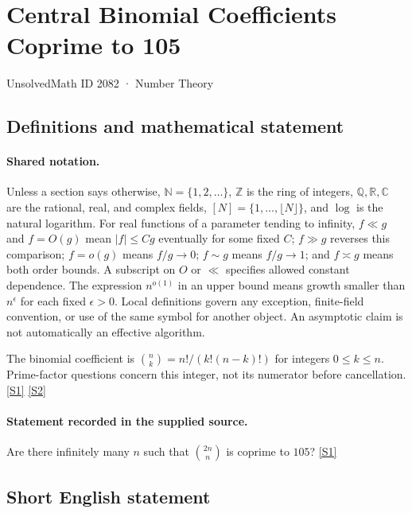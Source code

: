 \documentclass[11pt,a4paper]{article}
\newcommand{\N}{\mathbb{N}}
\newcommand{\Z}{\mathbb{Z}}
\newcommand{\Q}{\mathbb{Q}}
\newcommand{\R}{\mathbb{R}}
\newcommand{\C}{\mathbb{C}}
\newcommand{\sref}[2]{\hyperlink{source:#1:#2}{[S#2]}}
\begin{document}

\setcounter{section}{2081}

\section{Central Binomial Coefficients Coprime to 105}\label{2082}

{\small\sffamily UnsolvedMath ID 2082 · Number Theory}

\subsection{Definitions and mathematical statement}

\paragraph{Shared notation.}Unless a section says otherwise, $\N=\{1,2,\ldots\}$,
$\Z$ is the ring of integers, $\Q,\R,\C$ are the rational, real, and complex
fields, $[N]=\{1,\ldots,\lfloor N\rfloor\}$, and $\log$ is the natural
logarithm. For real functions of a parameter tending to infinity,
$f\ll g$ and $f=O(g)$ mean $|f|\leq Cg$ eventually for some fixed $C$;
$f\gg g$ reverses this comparison; $f=o(g)$ means $f/g\to0$;
$f\sim g$ means $f/g\to1$; and $f\asymp g$ means both order bounds.
A subscript on $O$ or $\ll$ specifies allowed constant dependence.
The expression $n^{o(1)}$ in an upper bound means growth smaller than
$n^\epsilon$ for each fixed $\epsilon>0$. Local definitions govern any
exception, finite-field convention, or use of the same symbol for another
object. An asymptotic claim is not automatically an effective algorithm.



The binomial coefficient is $\binom nk=n!/(k!(n-k)!)$ for integers $0\leq k\leq n$. Prime-factor questions concern this integer, not its numerator before cancellation. \sref{2082}{1} \sref{2082}{2}

\paragraph{Statement recorded in the supplied source.}
Are there infinitely many $n$ such that $\binom{2n}{n}$ is coprime to $105$? \sref{2082}{1}

\subsection{Short English statement}
\end{document}
